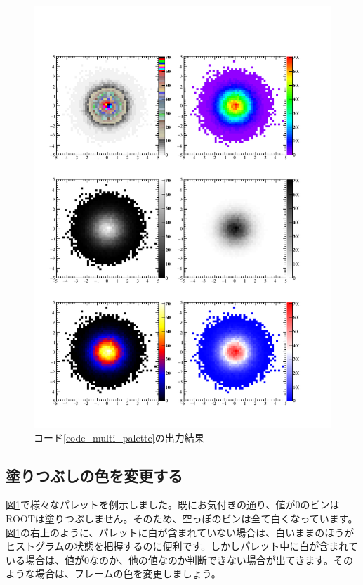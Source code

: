 \begin{NoFloat}

\end{NoFloat}

\begin{figure}
  \centering
  \includegraphics[width=12cm,clip]{fig/multi_palette.pdf}
  \caption{コード\ref{code_multi_palette}の出力結果}
  \label{fig_multi_palette_pdf}
\end{figure}

\subsection{塗りつぶしの色を変更する}

図\ref{fig_multi_palette_pdf}で様々なパレットを例示しました。既にお気付きの通り、値が0のビンはROOTは塗りつぶしません。そのため、空っぽのビンは全て白くなっています。図\ref{fig_multi_palette_pdf}の右上のように、パレットに白が含まれていない場合は、白いままのほうがヒストグラムの状態を把握するのに便利です。しかしパレット中に白が含まれている場合は、値が0なのか、他の値なのか判断できない場合が出てきます。そのような場合は、フレームの色を変更しましょう。

